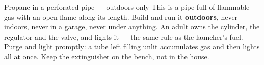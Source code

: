 



\begin{teloshazard}{Propane in a perforated pipe --- outdoors only}
This is a pipe full of flammable gas with an open flame along its length. Build
and run it \textbf{outdoors}, never indoors, never in a garage, never under
anything. An adult owns the cylinder, the regulator and the valve, and lights it
--- the same rule as the launcher's fuel. Purge and light promptly: a tube left
filling unlit accumulates gas and then lights all at once. Keep the extinguisher
on the bench, not in the house.
\end{teloshazard}

